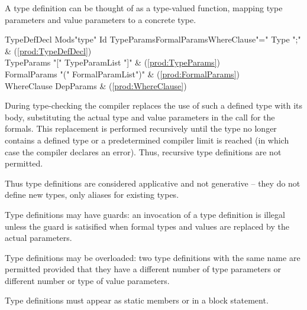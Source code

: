 A type definition can be thought of as a type-valued function,
mapping type parameters and value parameters to a concrete type.

\begin{bbgrammar}
         TypeDefDecl \: Mods\opt \xcd"type" Id TypeParams\opt FormalParams\opt WhereClause\opt \xcd"=" Type \xcd";" & (\ref{prod:TypeDefDecl}) \\
          TypeParams \: \xcd"[" TypeParamList \xcd"]" & (\ref{prod:TypeParams}) \\
        FormalParams \: \xcd"(" FormalParamList\opt \xcd")" & (\ref{prod:FormalParams}) \\
         WhereClause \: DepParams & (\ref{prod:WhereClause}) \\
\end{bbgrammar}

\noindent 
During type-checking the compiler replaces the use of such a defined
type with its body, substituting the actual type and value parameters
in the call for the formals. This replacement is performed recursively
until the type no longer contains a defined type or a predetermined
compiler limit is reached (in which case the compiler declares an
error). Thus, recursive type definitions are not permitted.

Thus type definitions are considered applicative and not generative --
they do not define new types, only aliases for existing types.

\label{TypeDefGuard}
Type definitions may have guards: an invocation of a type definition
is illegal unless the guard is satisified when formal types and values
are replaced by the actual parameters.

Type definitions may be overloaded: two type definitions with
the same name are permitted provided that they have a different number
of type parameters or different number or type of value parameters.

Type definitions must appear as static members or in a block statement.

